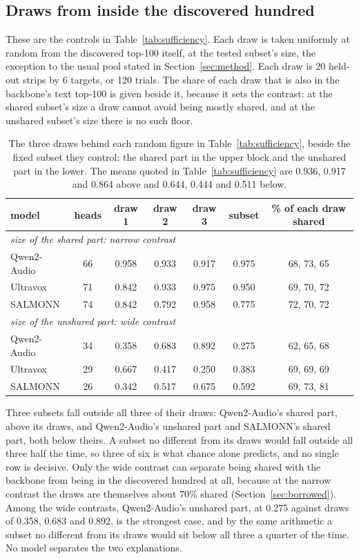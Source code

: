 \documentclass[11pt]{article}
\begin{document}
\subsection{Draws from inside the discovered hundred}

These are the controls in Table~\ref{tab:sufficiency}. Each draw is taken uniformly
at random from the discovered top-100 itself, at the tested subset's size, the
exception to the usual pool stated in Section~\ref{sec:method}. Each draw is 20
held-out strips by 6 targets, or 120 trials. The share of each draw that is also
in the backbone's text top-100 is given beside it, because it sets the contrast:
at the shared subset's size a draw cannot avoid being mostly shared, and at the
unshared subset's size there is no such floor.

\begin{table}[H]\centering\small
\begin{tabular}{lcccccc}
\toprule
model & heads & draw 1 & draw 2 & draw 3 & subset & \% of each draw shared \\
\midrule
\multicolumn{7}{l}{\emph{size of the shared part: narrow contrast}} \\
Qwen2-Audio & 66 & 0.958 & 0.933 & 0.917 & 0.975 & 68, 73, 65 \\
Ultravox    & 71 & 0.842 & 0.933 & 0.975 & 0.950 & 69, 70, 72 \\
SALMONN     & 74 & 0.842 & 0.792 & 0.958 & 0.775 & 72, 70, 72 \\
\midrule
\multicolumn{7}{l}{\emph{size of the unshared part: wide contrast}} \\
Qwen2-Audio & 34 & 0.358 & 0.683 & 0.892 & 0.275 & 62, 65, 68 \\
Ultravox    & 29 & 0.667 & 0.417 & 0.250 & 0.383 & 69, 69, 69 \\
SALMONN     & 26 & 0.342 & 0.517 & 0.675 & 0.592 & 69, 73, 81 \\
\bottomrule
\end{tabular}
\caption{The three draws behind each random figure in Table~\ref{tab:sufficiency},
beside the fixed subset they control: the shared part in the upper block and the
unshared part in the lower. The means quoted in Table~\ref{tab:sufficiency} are
0.936, 0.917 and 0.864 above and 0.644, 0.444 and 0.511 below.}
\label{tab:app-inside}
\end{table}

Three subsets fall outside all three of their draws: Qwen2-Audio's shared part,
above its draws, and Qwen2-Audio's unshared part and SALMONN's shared part, both
below theirs. A subset no different from its draws would fall outside all three
half the time, so three of six is what chance alone predicts, and no single row
is decisive. Only the wide contrast can separate being shared with the backbone
from being in the discovered hundred at all, because at the narrow contrast the
draws are themselves about 70\% shared (Section~\ref{sec:borrowed}). Among the
wide contrasts, Qwen2-Audio's unshared part, at 0.275 against draws of 0.358, 0.683 and 0.892, is
the strongest case, and by the same arithmetic a subset no different from its
draws would sit below all three a quarter of the time. No model separates the two
explanations.
\end{document}
